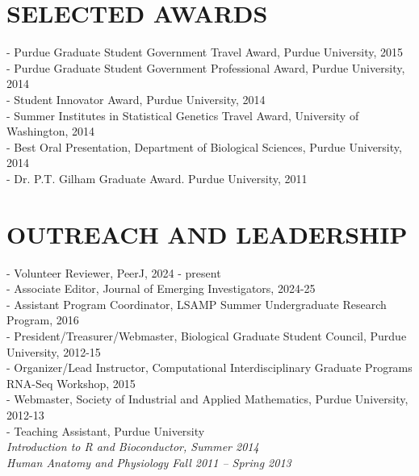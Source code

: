 \documentclass[11pt,letterpaper,sans]{moderncv}        %
\begin{document}
{{{\section{SELECTED AWARDS}
\begin{minipage}{\maincolumnwidth}%
	\small{
	- Purdue Graduate Student Government Travel Award, Purdue University, 2015\\
          - Purdue Graduate Student Government Professional Award, Purdue University, 2014\\
          - Student Innovator Award, Purdue University, 2014\\
          - Summer Institutes in Statistical Genetics Travel Award, University of Washington, 2014\\
	- Best Oral Presentation, Department of Biological Sciences, Purdue University, 2014\\
	 - Dr. P.T. Gilham Graduate Award. Purdue University, 2011
	}%
\end{minipage}%
 
\section{OUTREACH AND LEADERSHIP}
\begin{minipage}{\maincolumnwidth}%
	\small{
	 - Volunteer Reviewer, PeerJ, 2024 - present\\
	 - Associate Editor, Journal of Emerging Investigators, 2024-25\\
          - Assistant Program Coordinator, LSAMP Summer Undergraduate Research Program, 2016\\
          - President/Treasurer/Webmaster, Biological Graduate Student Council, Purdue University, 2012-15\\
          - Organizer/Lead Instructor, Computational Interdisciplinary Graduate Programs RNA-Seq Workshop, 2015\\
          - Webmaster, Society of Industrial and Applied Mathematics, Purdue University, 2012-13\\
	- Teaching Assistant, Purdue University\\
\tabto{4mm} \bullet \textit{Introduction to R and Bioconductor, Summer 2014}\\ 
\tabto{4mm}\bullet  \textit{Human Anatomy and Physiology Fall 2011 – Spring 2013}
	}%
\end{minipage}%

}
\nocite{*}
%

}}
\end{document}

